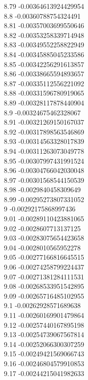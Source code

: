 {8.79	-0.00364613924429954\\
8.8	-0.00360788754324491\\
8.81	-0.00357003699550646\\
8.82	-0.00353258339714948\\
8.83	-0.00349552258822949\\
8.84	-0.00345885045233586\\
8.85	-0.00342256291613857\\
8.86	-0.00338665594893657\\
8.87	-0.00335112556221092\\
8.88	-0.00331596780919065\\
8.89	-0.00328117878440904\\
8.9	-0.00324675462328067\\
8.91	-0.00321269150167037\\
8.92	-0.00317898563546869\\
8.93	-0.00314563328017839\\
8.94	-0.00311263073049778\\
8.95	-0.00307997431991524\\
8.96	-0.00304766042030048\\
8.97	-0.00301568544150539\\
8.98	-0.0029840458309649\\
8.99	-0.00295273807331052\\
9	-0.00292175868997436\\
9.01	-0.00289110423881065\\
9.02	-0.0028607713137125\\
9.03	-0.00283075654423658\\
9.04	-0.0028010565952278\\
9.05	-0.00277166816645515\\
9.06	-0.00274258799224437\\
9.07	-0.00271381284111531\\
9.08	-0.00268533951542895\\
9.09	-0.00265716485102955\\
9.1	-0.00262928571689638\\
9.11	-0.00260169901479864\\
9.12	-0.00257440167895198\\
9.13	-0.00254739067567814\\
9.14	-0.00252066300307259\\
9.15	-0.00249421569066743\\
9.16	-0.00246804579910853\\
9.17	-0.00244215041982633\\
}
